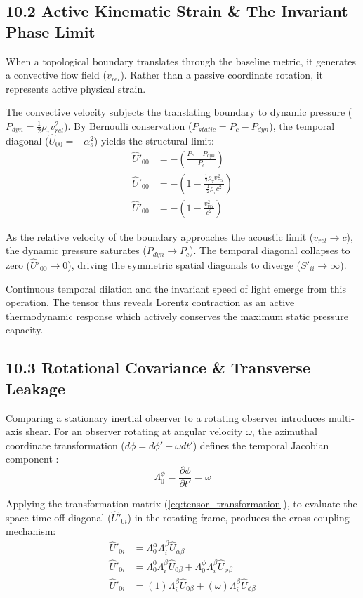 \subsection*{10.2 Active Kinematic Strain \& The Invariant Phase Limit}
When a topological boundary translates through the baseline metric, it generates a convective flow field ($v_{rel}$). Rather than a passive coordinate rotation, it represents active physical strain.

The convective velocity subjects the translating boundary to dynamic pressure ($P_{dyn} = \frac{1}{2}\rho_\tau v_{rel}^2$). 
By Bernoulli conservation \cite{Landau1987} ($P_{static} = P_c - P_{dyn}$), the temporal diagonal ($\hat{U}_{00} = -\alpha_s^2$) yields the structural limit:
\begin{align}
    \hat{U}'_{00} &= - \left( \frac{P_c - P_{dyn}}{P_c} \right) \nonumber \\
    \hat{U}'_{00} &= - \left( 1 - \frac{\frac{1}{2}\rho_\tau v_{rel}^2}{\frac{1}{2}\rho_\tau c^2} \right) \nonumber \\
    \hat{U}'_{00} &= - \left( 1 - \frac{v_{rel}^2}{c^2} \right) \label{eq:covar_temporal_diagonal}
\end{align}

As the relative velocity of the boundary approaches the acoustic limit ($v_{rel} \to c$), the dynamic pressure saturates ($P_{dyn} \to P_c$). The temporal diagonal collapses to zero ($\hat{U}'_{00} \to 0$), driving the symmetric spatial diagonals to diverge ($S'_{ii} \to \infty$). 

Continuous temporal dilation and the invariant speed of light emerge from this operation. The tensor thus reveals Lorentz contraction as an active thermodynamic response which actively conserves the maximum static pressure capacity.

\subsection*{10.3 Rotational Covariance \& Transverse Leakage}
Comparing a stationary inertial observer to a rotating observer introduces multi-axis shear. For an observer rotating at angular velocity $\omega$, the azimuthal coordinate transformation ($d\phi = d\phi' + \omega dt'$) defines the temporal Jacobian component \cite{Landau1971}:
\begin{equation}
    \Lambda^\phi_0 = \frac{\partial \phi}{\partial t'} = \omega
\end{equation}

Applying the transformation matrix (\ref{eq:tensor_transformation}), to evaluate the space-time off-diagonal ($\hat{U}'_{0i}$) in the rotating frame, produces the cross-coupling mechanism: 
\begin{align}
    \hat{U}'_{0i} &= \Lambda^\alpha_0 \Lambda^\beta_i \hat{U}_{\alpha\beta} \nonumber \\
    \hat{U}'_{0i} &= \Lambda^0_0 \Lambda^\beta_i \hat{U}_{0\beta} + \Lambda^\phi_0 \Lambda^\beta_i \hat{U}_{\phi\beta} \nonumber \\
    \hat{U}'_{0i} &= (1)\Lambda^\beta_i \hat{U}_{0\beta} + (\omega)\Lambda^\beta_i \hat{U}_{\phi\beta} \label{eq:covar_rotational_leakage}
\end{align}

